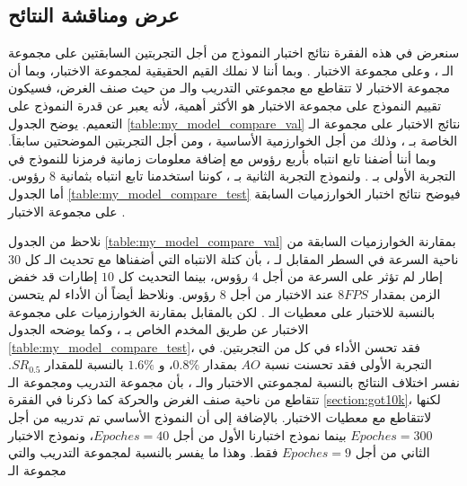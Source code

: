 \subsection{عرض ومناقشة النتائح}
سنعرض في هذه الفقرة نتائج اختبار النموذج من أجل التجربتين السابقتين على مجموعة الـ
،
وعلى مجموعة الاختبار 
.
وبما أننا لا نملك القيم الحقيقية لمجموعة الاختبار، وبما أن مجموعة الاختبار لا تتقاطع مع مجموعتي التدريب والـ 
من حيث صنف الغرض، فسيكون تقييم النموذج على مجموعة الاختبار هو الأكثر أهمية، لأنه يعبر عن قدرة النموذج على التعميم.
\newline
يوضح الجدول
\ref{table:my_model_compare_val}
نتائج الاختبار على مجموعة الـ
الخاصة بـ
،
وذلك من أجل الخوارزمية الأساسية 
،
ومن أجل التجربتين الموضحتين سابقاَ. وبما أننا أضفنا تابع انتباه بأربع رؤوس مع إضافة معلومات زمانية فرمزنا للنموذج في التجربة الأولى بـ
.
ولنموذج التجربة الثانية بـ 
،
كوننا استخدمنا تابع انتباه بثمانية
$8$
رؤوس.
\newline
أما الجدول 
\ref{table:my_model_compare_test}
فيوضح نتائج اختبار الخوارزميات السابقة على مجموعة الاختبار 
.

نلاحظ من الجدول 
\ref{table:my_model_compare_val}
بمقارنة الخوارزميات السابقة من ناحية السرعة في السطر المقابل لـ 
،
بأن كتلة الانتباه التي أضفناها مع تحديث الـ
كل 
$30$
إطار لم تؤثر على السرعة من أجل $4$ رؤوس، بينما التحديث كل 
$10$
إطارات قد خفض الزمن بمقدار 
$8FPS$
عند الاختبار من أجل
$8$
رؤوس.
ونلاحظ أيضاً أن الأداء لم يتحسن بالنسبة للاختبار على معطيات الـ
.
\newline
لكن بالمقابل 
بمقارنة الخوارزميات على مجموعة الاختبار
عن طريق المخدم الخاص بـ
،
وكما يوضحه الجدول 
\ref{table:my_model_compare_test}،
%
فقد تحسن الأداء في كل من التجربتين. في التجربة الأولى
 فقد تحسنت نسبة
$AO$
بمقدار
$0.8\%$،
و
$1.6\%$
بالنسبة للمقدار
$SR_{0.5}$.
نفسر اختلاف النتائج بالنسبة لمجموعتي الاختبار والـ
،
بأن مجموعة التدريب ومجموعة الـ
تتقاطع من ناحية صنف الغرض والحركة كما ذكرنا في الفقرة
\ref{section:got10k}،
لكنها لاتتقاطع مع معطيات الاختبار.
بالإضافة إلى أن النموذج الأساسي تم تدريبه من أجل 
$Epoches = 300$
بينما نموذج اختبارنا الأول من أجل 
$Epoches = 40$،
ونموذج الاختبار الثاني من أجل 
$Epoches = 9$ 
فقط. وهذا ما يفسر 
بالنسبة لمجموعة التدريب والتي مجموعة الـ
